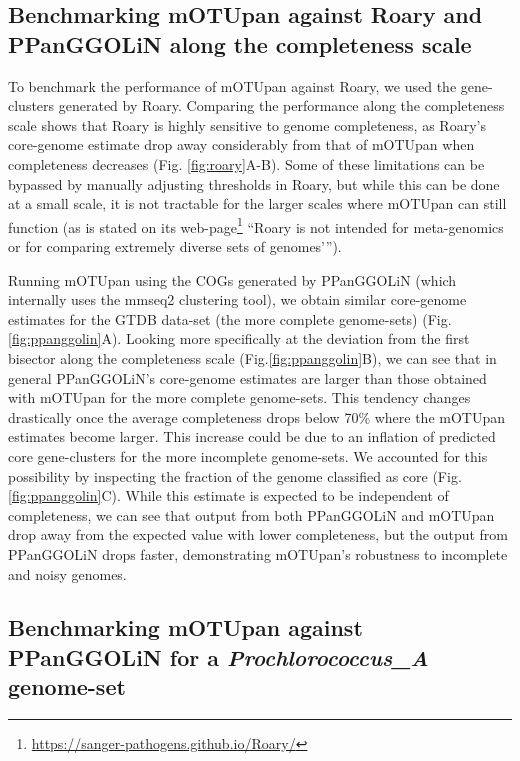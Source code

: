 \documentclass{article}
\begin{document}
\subsection*{Benchmarking mOTUpan against Roary and PPanGGOLiN along the completeness scale}

To benchmark the performance of mOTUpan against Roary, we used the gene-clusters generated by Roary. Comparing the performance along the completeness scale shows that Roary is highly sensitive to genome completeness, as Roary’s core-genome estimate drop away considerably from that of mOTUpan when completeness decreases (Fig. \ref{fig:roary}A-B). Some of these limitations can be bypassed by manually adjusting thresholds in Roary, but while this can be done at a small scale, it is not tractable for the larger scales where mOTUpan can still function (as is stated on its web-page\footnote{\href{https://sanger-pathogens.github.io/Roary/}{https://sanger-pathogens.github.io/Roary/}} ``Roary is not intended for meta-genomics or for comparing extremely diverse sets of genomes’'').

Running mOTUpan using the COGs generated by PPanGGOLiN (which internally uses the mmseq2\citep{gautreau_2020} clustering tool), we obtain similar core-genome estimates for the GTDB data-set (the more complete genome-sets) (Fig.\ref{fig:ppanggolin}A). Looking more specifically at the deviation from the first bisector along the completeness scale (Fig.\ref{fig:ppanggolin}B), we can see that in general PPanGGOLiN’s core-genome estimates are larger than those obtained with mOTUpan for the more complete genome-sets. This tendency changes drastically once the average completeness drops below 70\% where the mOTUpan estimates become larger. This increase could be due to an inflation of predicted core gene-clusters for the more incomplete genome-sets. We accounted for this possibility by inspecting the fraction of the genome classified as core (Fig.\ref{fig:ppanggolin}C). While this estimate is expected to be independent of completeness, we can see that output from both PPanGGOLiN and mOTUpan drop away from the expected value with lower completeness, but the output from PPanGGOLiN drops faster, demonstrating mOTUpan’s robustness to incomplete and noisy genomes.

\subsection*{Benchmarking mOTUpan against PPanGGOLiN for a \textit{Prochlorococcus\_A} genome-set}
\end{document}
